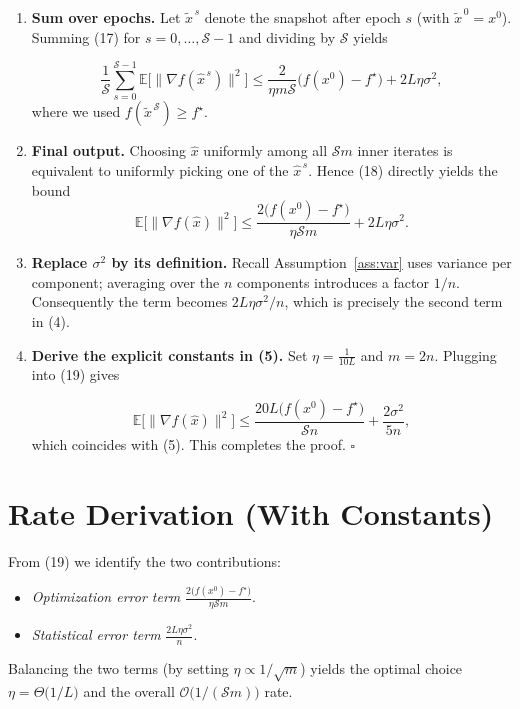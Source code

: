 \documentclass{article}
\newcommand{\E}{\mathbb{E}}
\begin{document}
\begin{enumerate}[label=[Step \arabic*], leftmargin=*, nosep]
\item \textbf{Sum over epochs.}  
Let \(\tilde{x}^{\,s}\) denote the snapshot after epoch \(s\) (with \(\tilde{x}^{\,0}=x^{0}\)).
Summing (17) for \(s=0,\dots,\mathcal{S}-1\) and dividing by \(\mathcal{S}\) yields

\[
\frac{1}{\mathcal{S}}\sum_{s=0}^{\mathcal{S}-1}
\E\!\bigl[\|\nabla f(\hat{x}^{\,s})\|^{2}\bigr]
\le \frac{2}{\eta m\mathcal{S}}
      \bigl(f(x^{0})-f^{\star}\bigr)
   + 2L\eta\sigma^{2},
\tag{18}
\]
where we used \(f(\tilde{x}^{\,\mathcal{S}})\ge f^{\star}\).

\item \textbf{Final output.}  
Choosing \(\hat{x}\) uniformly among all \(\mathcal{S}m\) inner iterates is equivalent to
uniformly picking one of the \(\hat{x}^{\,s}\).  Hence (18) directly yields the bound
\[
\E\!\bigl[\|\nabla f(\hat{x})\|^{2}\bigr]
\le \frac{2\bigl(f(x^{0})-f^{\star}\bigr)}{\eta \mathcal{S}m}
   + 2L\eta\sigma^{2}.
\tag{19}
\]

\item \textbf{Replace \(\sigma^{2}\) by its definition.}  
Recall Assumption~\ref{ass:var} uses variance per component; averaging over the
\(n\) components introduces a factor \(1/n\).  Consequently the term becomes
\(2L\eta\sigma^{2}/n\), which is precisely the second term in (4).

\item \textbf{Derive the explicit constants in (5).}  
Set \(\eta = \frac{1}{10L}\) and \(m=2n\).  Plugging into (19) gives

\[
\E\!\bigl[\|\nabla f(\hat{x})\|^{2}\bigr]
\le
\frac{20L\bigl(f(x^{0})-f^{\star}\bigr)}{\mathcal{S}n}
+ \frac{2\sigma^{2}}{5n},
\]
which coincides with (5).  This completes the proof. \(\square\)
\end{enumerate}

\section*{Rate Derivation (With Constants)}
From (19) we identify the two contributions:

\begin{itemize}
\item \emph{Optimization error term} \( \displaystyle
\frac{2\bigl(f(x^{0})-f^{\star}\bigr)}{\eta \mathcal{S}m}\).
\item \emph{Statistical error term} \( \displaystyle
\frac{2L\eta\sigma^{2}}{n}\).
\end{itemize}
Balancing the two terms (by setting \(\eta\propto 1/\sqrt{m}\)) yields the optimal
choice \(\eta = \Theta\!\bigl(1/L\bigr)\) and the overall \(\mathcal{O}\!\bigl(1/(\mathcal{S}m)\bigr)\) rate.
\end{document}
